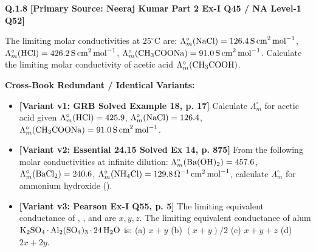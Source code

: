 \begin{problembox}
\textbf{Q.1.8} \hfill \textbf{[Primary Source: Neeraj Kumar Part 2 Ex-I Q45 / NA Level-1 Q52]}
\label{q:qb-c1-08}

The limiting molar conductivities at $25^\circ\text{C}$ are:
$\Lambda_m^\circ(\ce{NaCl}) = 126.4\,\text{S\,cm}^2\,\text{mol}^{-1}$,
$\Lambda_m^\circ(\ce{HCl}) = 426.2\,\text{S\,cm}^2\,\text{mol}^{-1}$,
$\Lambda_m^\circ(\ce{CH3COONa}) = 91.0\,\text{S\,cm}^2\,\text{mol}^{-1}$.
Calculate the limiting molar conductivity of acetic acid $\Lambda_m^\circ(\ce{CH3COOH})$.

\tcbline
\textbf{\color{accentamber}Cross-Book Redundant / Identical Variants:}
\begin{itemize}[leftmargin=*,itemsep=2pt]
    \item \textbf{[Variant v1: GRB Solved Example 18, p. 17]} Calculate $\Lambda_m^\circ$ for acetic acid given $\Lambda_m^\circ(\ce{HCl}) = 425.9$, $\Lambda_m^\circ(\ce{NaCl}) = 126.4$, $\Lambda_m^\circ(\ce{CH3COONa}) = 91.0\,\text{S\,cm}^2\,\text{mol}^{-1}$.
    \item \textbf{[Variant v2: Essential  24.15 Solved Ex 14, p. 875]} From the following molar conductivities at infinite dilution: $\Lambda_m^\circ(\ce{Ba(OH)2}) = 457.6$, $\Lambda_m^\circ(\ce{BaCl2}) = 240.6$, $\Lambda_m^\circ(\ce{NH4Cl}) = 129.8\,\Omega^{-1}\,\text{cm}^2\,\text{mol}^{-1}$, calculate $\Lambda_m^\circ$ for ammonium hydroxide ().
    \item \textbf{[Variant v3: Pearson Ex-I Q55, p. 5]} The limiting equivalent conductance of , , and  are $x, y, z$. The limiting equivalent conductance of alum $\ce{K2SO4.Al2(SO4)3.24H2O}$ is: (a) $x+y$ (b) $(x+y)/2$ (c) $x+y+z$ (d) $2x+2y$.
\end{itemize}
\end{problembox}

